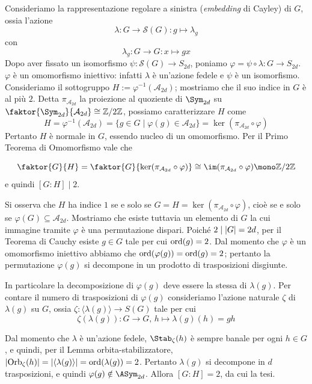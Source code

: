 \documentclass[11pt]{scrartcl}
\begin{document}
	\begin{soln}
		Consideriamo la rappresentazione regolare a sinistra (\textit{embedding} di Cayley) di $G$, ossia l'azione
		\[
		\lambda: G \to \mathcal{S}(G) : g \mapsto \lambda_g
		\]
		con
		\[
		\lambda_g : G \to G : x \mapsto gx
		\]
		Dopo aver fissato un isomorfismo $\psi: \mathcal{S}(G) \to S_{2d}$, poniamo
		$\varphi = \psi \circ \lambda : G \to S_{2d}$. $\varphi$ è 
		un omomorfismo iniettivo: infatti $\lambda$ è un'azione fedele e $\psi$ è
		un isomorfismo. Consideriamo 
		il sottogruppo $H := \varphi^{-1}(\mathcal{A}_{2d})$; mostriamo che il suo 
		indice in $G$ è al più $2$.
		Detta $\pi_{\mathcal{A}_{2d}}$ la proiezione al quoziente di $\Sym_{2d}$ su
		$\faktor{\Sym_{2d}}{\mathcal{A}_{2d}} \cong \Z2$, possiamo caratterizzare $H$ come
		\[
		H = \varphi^{-1}(\mathcal{A}_{2d}) = \{g \in G \mid \varphi(g) \in \mathcal{A}_{2d}\}
		= \ker (\pi_{\mathcal{A}_{2d}}\circ\varphi)
		\]
		Pertanto $H$ è normale in $G$, essendo nucleo di un omomorfismo. 
		Per il Primo Teorema di Omomorfismo vale che
		
		\[ \faktor{G}{H} = \faktor{G}{\ker(\pi_{\mathcal{A}_{2d}}\circ\varphi)} \cong \im(\pi_{\mathcal{A}_{2d}}\circ\varphi) \mono \Z2 \]
		e quindi $[G : H] \mid 2$. \medskip
		

		Si osserva che $H$ ha indice $1$ se e solo se $G = H = \ker(\pi_{\mathcal{A}_{2d}}\circ\varphi)$,
		cioè se e solo se $\varphi(G) \subseteq \mathcal{A}_{2d}$. Mostriamo che esiste
		tuttavia
		un elemento di $G$ la cui immagine tramite $\varphi$ è una permutazione 
		dispari. Poiché $2 \mid \left\lvert G \right\rvert = 2d$, per il Teorema di Cauchy esiste
		$g \in G$ tale per cui $\operatorname{ord}(g) = 2$. Dal momento che $\varphi$
		è un omomorfismo iniettivo abbiamo che $\operatorname{ord}(\varphi(g)) = \operatorname{ord}(g) = 2$;
		pertanto la permutazione $\varphi(g)$ si decompone in un prodotto di trasposizioni
		disgiunte.  \medskip
		
		
		In particolare la decomposizione di $\varphi(g)$ deve essere la stessa di
		$\lambda(g)$. Per contare il numero di trasposizioni di $\varphi(g)$
		consideriamo l'azione naturale $\zeta$ di $\lambda(g)$ su $G$, ossia $\zeta : \langle \lambda(g) \rangle \to S(G)$ tale per cui
		\[ \zeta(\lambda(g)) : G \to G, \, h \mapsto \lambda(g)(h) = gh \]
		
	 	Dal momento che $\lambda$ è un'azione fedele, $\Stab_\zeta(h)$ è sempre
		banale per ogni $h \in G$, e quindi, per il Lemma
		orbita-stabilizzatore, $\left\lvert \operatorname{Orb}_\zeta(h) \right\rvert = \left\lvert \langle \lambda(g) \rangle \right\rvert =
		\operatorname{ord}(\lambda(g)) = 2$. Pertanto $\lambda(g)$ si decompone in $d$ trasposizioni,
		e quindi $\varphi(g) \notin \ASym_{2d}$. Allora
		$[G : H] = 2$, da cui la tesi.
	\end{soln}
	
\end{document}
